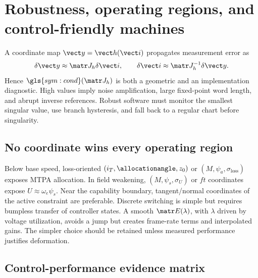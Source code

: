 \section{Robustness, operating regions, and control-friendly machines}
\label{sec:coordinate-robustness}

A coordinate map \(\vect y=\vect h(\vect i)\) propagates measurement error as
\[
 \delta\vect y\approx\matr J_h\delta\vect i,\qquad
 \delta\vect i\approx\matr J_h^{-1}\delta\vect y.
\]
Hence \(\gls{sym:cond}(\matr J_h)\) is both a geometric and an implementation
diagnostic. High values imply noise amplification, large fixed-point word
length, and abrupt inverse references. Robust software must monitor the
smallest singular value, use branch hysteresis, and fall back to a regular
chart before singularity.

\subsection{No coordinate wins every operating region}

Below base speed, loss-oriented \((i_T,\allocationangle,z_0)\) or
\((M,\psi_a,\sigma_{\mathrm{loss}})\) exposes MTPA allocation. In field
weakening, \((M,\psi_s,\sigma_U)\) or \(ft\) coordinates expose
\(U\approx\omega_e\psi_s\). Near the capability boundary, tangent/normal
coordinates of the active constraint are preferable. Discrete switching is
simple but requires bumpless transfer of controller states. A smooth
\(\matr E(\lambda)\), with \(\lambda\) driven by voltage utilization, avoids
a jump but creates frame-rate terms and interpolated gains. The simpler choice
should be retained unless measured performance justifies deformation.

\subsection{Control-performance evidence matrix}

